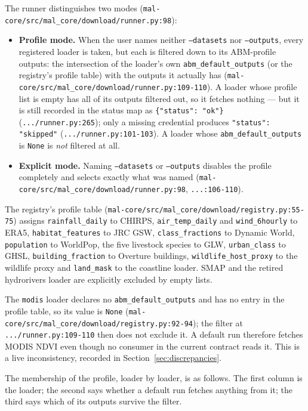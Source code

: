 \documentclass[11pt,a4paper]{article}
\newcommand{\code}[1]{\texttt{#1}}
\begin{document}
The runner distinguishes two modes
(\code{mal-core/src/mal\_core/download/runner.py:98}):

\begin{itemize}
\item \textbf{Profile mode.} When the user names neither \code{--datasets}
nor \code{--outputs}, every registered loader is taken, but each is filtered
down to its ABM-profile outputs: the intersection of the loader's own
\code{abm\_default\_outputs} (or the registry's profile table) with the
outputs it actually has
(\code{mal-core/src/mal\_core/download/runner.py:109-110}). A loader whose
profile list is empty has all of its outputs filtered out, so it fetches
nothing --- but it is still recorded in the status map as
\code{\{"status": "ok"\}} (\code{.../runner.py:265}); only a missing
credential produces \code{"status": "skipped"}
(\code{.../runner.py:101-103}). A loader whose \code{abm\_default\_outputs}
is \code{None} is \emph{not} filtered at all.
\item \textbf{Explicit mode.} Naming \code{--datasets} or \code{--outputs}
disables the profile completely and selects exactly what was named
(\code{mal-core/src/mal\_core/download/runner.py:98},
\code{...:106-110}).
\end{itemize}

The registry's profile table
(\code{mal-core/src/mal\_core/download/registry.py:55-75}) assigns
\code{rainfall\_daily} to CHIRPS, \code{air\_temp\_daily} and
\code{wind\_6hourly} to ERA5, \code{habitat\_features} to JRC GSW,
\code{class\_fractions} to Dynamic World, \code{population} to WorldPop, the
five livestock species to GLW, \code{urban\_class} to GHSL,
\code{building\_fraction} to Overture buildings,
\code{wildlife\_host\_proxy} to the wildlife proxy and \code{land\_mask} to
the coastline loader. SMAP and the retired hydrorivers loader are explicitly
excluded by empty lists.

The \code{modis} loader declares no \code{abm\_default\_outputs} and has no
entry in the profile table, so its value is \code{None}
(\code{mal-core/src/mal\_core/download/registry.py:92-94}); the filter at
\code{.../runner.py:109-110} then does not exclude it. A default run
therefore fetches MODIS NDVI even though no consumer in the current contract
reads it. This is a live inconsistency, recorded in
Section~\ref{sec:discrepancies}.

The membership of the profile, loader by loader, is as follows. The first
column is the loader; the second says whether a default run fetches anything
from it; the third says which of its outputs survive the filter.
\end{document}
